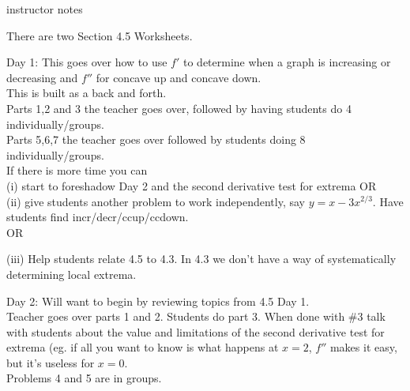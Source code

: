\documentclass[11pt,fleqn]{article}
\begin{document}
\setlength{\parindent}{0cm}
\renewcommand{\headrulewidth}{0pt}
\newcommand{\blank}[1]{\rule{#1}{0.75pt}}
\renewcommand{\d}{\displaystyle}
\vspace*{-0.7in}
\begin{center}
 {\large{ }}
 instructor notes
\end{center}
 
There are two Section 4.5 Worksheets.\\
\vfill

Day 1: This goes over how to use $f'$ to determine when a graph is increasing or decreasing and $f''$ for concave up and concave down. \\

This is built as a back and forth. \\
Parts 1,2 and 3 the teacher goes over, followed by having students do 4 individually/groups.\\

Parts 5,6,7 the teacher goes over followed by students doing 8 individually/groups.\\

If there is more time you can\\

 (i) start to foreshadow Day 2 and the second derivative test for extrema OR \\
 
 (ii) give students another problem to work independently, say $y=x-3x^{2/3}$. Have students find incr/decr/ccup/ccdown.\\
 
 OR
 
 (iii) Help students relate 4.5 to 4.3. In 4.3 we don't have a way of systematically determining local extrema.
 
 \vfill
 
 Day 2: Will want to begin by reviewing topics from 4.5 Day 1. \\
 
 Teacher goes over parts 1 and 2. Students do part 3. When done with \#3 talk with students about the value and limitations of the second derivative test for extrema (eg. if all you want to know is what happens at $x=2$, $f''$ makes it easy, but it's useless for $x=0.$\\
 
 Problems 4 and 5 are in groups.\\
 
 
\end{document}
